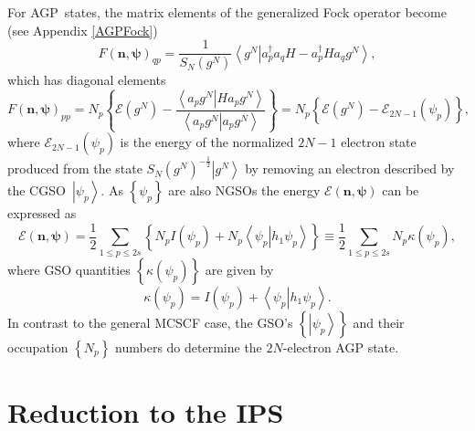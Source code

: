 \documentclass[aps,preprint]{revtex4}%
\begin{document}
For AGP\ states, the matrix elements of the generalized Fock operator become
(see Appendix \ref{AGPFock})
\begin{equation}
F\left(  \bm{n},\bm{\psi}\right)  _{qp}=\frac{1}{S_{N}\left(  g^{N}\right)
}\left\langle \left.  g^{N}\right\vert a_{p}^{\dagger}a_{q}H-a_{p}^{\dagger
}Ha_{q}g^{N}\right\rangle ,
\end{equation}
which has diagonal elements
\begin{equation}
F\left(  \bm{n},\bm{\psi}\right)  _{pp}=N_{p}\left\{  \mathcal{E}\left(
g^{N}\right)  -\frac{\left\langle \left.  a_{p}g^{N}\right\vert Ha_{p}%
g^{N}\right\rangle }{\left\langle \left.  a_{p}g^{N}\right\vert a_{p}%
g^{N}\right\rangle }\right\}  =N_{p}\left\{  \mathcal{E}\left(  g^{N}\right)
-\mathcal{E}_{2N-1}\left(  \psi_{p}\right)  \right\}  ,
\end{equation}
where $\mathcal{E}_{2N-1}\left(  \psi_{p}\right)  $ is the energy of the
normalized $2N-1$ electron state produced from the state $S_{N}\left(
g^{N}\right)  ^{-\frac{1}{2}}\left\vert g^{N}\right\rangle $ by removing an
electron described by the CGSO\ $\left\vert \psi_{p}\right\rangle $. As
$\left\{  \psi_{p}\right\}  $ are also NGSOs the energy $\mathcal{E}\left(
\bm{n},\bm{\psi}\right)  $ can be expressed as
\begin{equation}
\mathcal{E}\left(  \bm{n},\bm{\psi}\right)  =\frac{1}{2}\sum_{1\leq p\leq
2s}\left\{  N_{p}I\left(  \psi_{p}\right)  +N_{p}\left\langle \left.  \psi
_{p}\right\vert h_{1}\psi_{p}\right\rangle \right\}  \equiv\frac{1}{2}%
{\textstyle\sum\limits_{1\leq p\leq2s}}
N_{p}\kappa\left(  \psi_{p}\right)  ,
\end{equation}
where GSO quantities $\left\{  \kappa\left(  \psi_{p}\right)  \right\}  $ are
given by
\begin{equation}
\kappa\left(  \psi_{p}\right)  =I\left(  \psi_{p}\right)  +\left\langle
\left.  \psi_{p}\right\vert h_{1}\psi_{p}\right\rangle .
\end{equation}
In contrast to the general MCSCF case, the GSO's $\left\{  \left\vert \psi
_{p}\right\rangle \right\}  $ and their occupation $\left\{  N_{p}\right\}  $
numbers do determine the $2N$-electron AGP state.

\section{Reduction to the IPS \label{IPS}}
\end{document}
